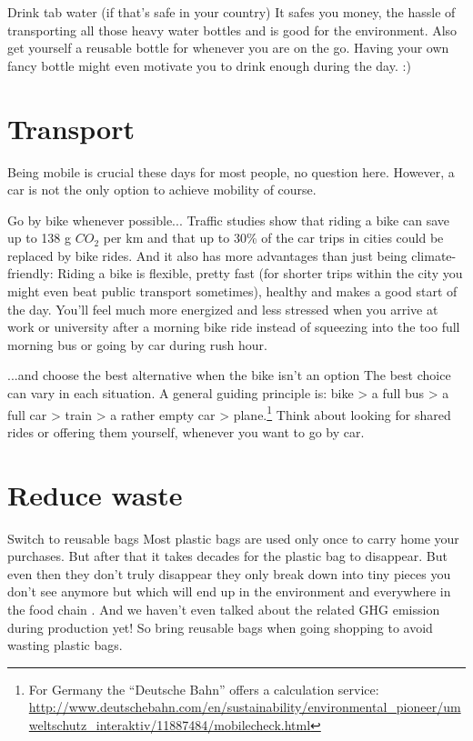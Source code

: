 \begin{suggest}{Drink tab water (if that's safe in your country)}
	It safes you money, the hassle of transporting all those heavy water bottles and is good for the environment. Also get yourself a reusable bottle for whenever you are on the go. Having your own fancy bottle might even motivate you to drink enough during the day. :)
\end{suggest}

\section{Transport}
	Being mobile is crucial these days for most people, no question here. However, a car is not the only option to achieve mobility of course.
\begin{suggest}{Go by bike whenever possible...}
	Traffic studies show that riding a bike can save up to 138 g $CO_{2}$  per km and that up to 30\% of the car trips in cities could be replaced by bike rides\cite{bike}. And it also has more advantages than just being climate-friendly: Riding a bike is flexible, pretty fast (for shorter trips within the city you might even beat public transport sometimes), healthy and makes a good start of the day. You'll feel much more energized and less stressed when you arrive at work or university after a morning bike ride instead of squeezing into the too full morning bus or going by car during rush hour.
\end{suggest}

\begin{suggest}{...and choose the best alternative when the bike isn't an option}
	The best choice can vary in each situation.	A general guiding principle is: bike > a full bus > a full car > train > a rather empty car > plane.\footnote{For Germany the ``Deutsche Bahn''  offers a calculation service: \url{http://www.deutschebahn.com/en/sustainability/environmental_pioneer/umweltschutz_interaktiv/11887484/mobilecheck.html}} Think about looking for shared rides or offering them yourself, whenever you want to go by car.
\end{suggest}

\section{Reduce waste}
\begin{suggest}{Switch to reusable bags}
	Most plastic bags are used only once to carry home your purchases. But after that it takes decades for the plastic bag to disappear. But even then they don't truly disappear they only break down into tiny pieces you don't see anymore but which will end up in the environment and everywhere in the food chain \cite{plasticbags}. And we haven't even talked about the related GHG emission during production yet! So bring reusable bags when going shopping to avoid wasting plastic bags.
\end{suggest}

